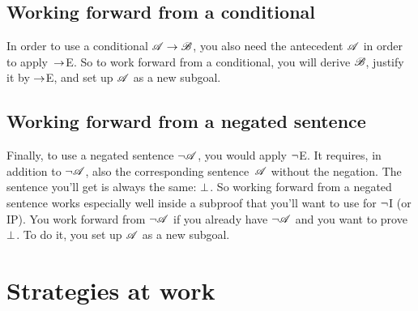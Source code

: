 \subsection*{Working forward from a conditional}

In order to use a conditional $\mathscr{A} \rightarrow \mathscr{B}$, you also need the antecedent $\mathscr{A}$ in order to apply~$\rightarrow$E. So to work forward from a conditional, you will derive $\mathscr{B}$, justify it by $\rightarrow$E, and set up $\mathscr{A}$ as a new subgoal.
\begin{fitchproof}
	\ellipsesline 
\end{fitchproof}

\subsection*{Working forward from a negated sentence}

Finally, to use a negated sentence $\neg \mathscr{A}$, you would apply $\neg$E. It requires, in addition to $\neg \mathscr{A}$, also the corresponding sentence~$\mathscr{A}$ without the negation. The sentence you'll get is always the same: $\bot$. So working forward from a negated sentence works especially well inside a subproof that you'll want to use for $\neg$I (or IP). You work forward from $\neg \mathscr{A}$ if you already have $\neg \mathscr{A}$ and you want to prove~$\bot$. To do it, you set up $\mathscr{A}$ as a new subgoal.
\begin{fitchproof}
	\ellipsesline 
\end{fitchproof}

\section{Strategies at work}

